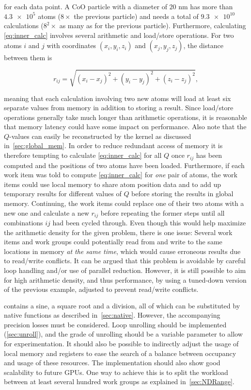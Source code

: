 \documentclass[11pt,twoside]{report}
\newcommand{\chem}[1]{\ensuremath{\mathrm{#1}}}
\begin{document}
\noindent for each data point. A \chem{CoO} particle with a diameter of $20$ nm has more than $\num{4.3e5}$  atoms ($8\times$ the previous particle) and needs a total of $\num{9.3e10}$ calculations ($8^{2}\times$ as many as for the previous particle).  Furthermore, calculating \cref{eq:inner_calc} involves several arithmetic and load/store operations. For two atoms $i$ and $j$ with coordinates $(x_{i},y_{i},z_{i})$ and $(x_{j},y_{j},z_{j})$, the distance between them is

\begin{equation}
r_{ij} = \sqrt{(x_{i}-x_{j})^{2} + (y_{i}-y_{j})^{2} + (z_{i}-z_{j})^{2}},
\label{eq:norm}
\end{equation} 


\noindent meaning that each calculation involving two new atoms  will load at least six separate values from memory in addition to storing a result.  Since load/store operations generally take much longer than arithmetic operations, it is reasonable that memory latency  could have some impact on performance. Also note that the $Q$-values can easily be reconstructed by the kernel as discussed in~\cref{sec:global_mem}. In order to reduce redundant access of memory it is therefore tempting to calculate \cref{eq:inner_calc} for all $Q$ once $r_{ij}$ has been computed and the positions of two atoms have been loaded. Furthermore, if each work item was told to compute \cref{eq:inner_calc} for {\it one} pair of atoms, the work items could use local memory to share atom position data and to add up temporary results for different values of $Q$ before storing the results in global memory. Continuing, the work items could replace one of their two atoms with a new one and calculate a new $r_{ij}$ before repeating the former steps until all combinations $ij$ had been cycled through. Even though this would help maximize the arithmetic density for the given problem, there is one issue: Several work items and work groups could potentially read from and write to the same locations in memory {\it at the same time}, which would cause erroneous results due to read/write conflicts. It can be argued that this problem is avoidable by careful loop handling and/or use of parallel reduction. However, it is still possible to aim for high arithmetic density, and thus performance, by using a tuned-down version of the previous example, adjusted to prevent read/write conflicts.

\indent {} contains a sine, a square root and a division, all of which can be substituted by native functions as described in~\cref{sec:native}. However, the accompanying precision losses must be considered. Loop unrolling should be implemented (\cref{sec:unroll}), and the grade of unrolling should be a variable parameter to allow for experimentation. It should also be possible to indirectly adjust the usage of local memory and registers to ease the search of a balance between occupancy and usage of  these resources. The implementation should also show good scalability to future GPUs. One way to achieve this is to split the workload between at least several hundred work groups as explained in~\cref{sec:NDRange}.   
\end{document}
